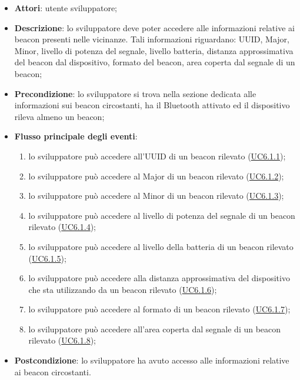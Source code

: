 \documentclass[../AnalisiDeiRequisiti.tex]{subfiles}
\begin{document}
\begin{itemize}
	\item \textbf{Attori}: utente sviluppatore;
	\item \textbf{Descrizione}: lo sviluppatore deve poter accedere alle informazioni relative ai beacon presenti nelle vicinanze. Tali informazioni riguardano: UUID, Major, Minor, livello di potenza del segnale, livello batteria, distanza approssimativa del beacon dal dispositivo, formato del beacon, area coperta dal segnale di un beacon; 
	\item \textbf{Precondizione}: lo sviluppatore si trova nella sezione dedicata alle informazioni sui beacon circostanti, ha il Bluetooth attivato ed il dispositivo rileva almeno un beacon;
	
	\item \textbf{Flusso principale degli eventi}:
	\begin{enumerate}
		\item lo sviluppatore può accedere all'UUID di un beacon rilevato (\hyperlink{UC6.1.1}{UC6.1.1});
		\item lo sviluppatore può accedere al Major di un beacon rilevato (\hyperlink{UC6.1.2}{UC6.1.2});
		\item lo sviluppatore può accedere al Minor di un beacon rilevato (\hyperlink{UC6.1.3}{UC6.1.3});
		\item lo sviluppatore può accedere al livello di potenza del segnale di un beacon rilevato (\hyperlink{UC6.1.4}{UC6.1.4});
		\item lo sviluppatore può accedere al livello della batteria di un beacon rilevato (\hyperlink{UC6.1.5}{UC6.1.5});
		\item lo sviluppatore può accedere alla distanza approssimativa del dispositivo che sta utilizzando da un beacon rilevato (\hyperlink{UC6.1.6}{UC6.1.6});
		\item lo sviluppatore può accedere al formato di un beacon rilevato (\hyperlink{UC6.1.7}{UC6.1.7});
		\item lo sviluppatore può accedere all'area coperta dal segnale di un beacon rilevato (\hyperlink{UC6.1.8}{UC6.1.8});
		
	\end{enumerate}
	\item \textbf{Postcondizione}: lo sviluppatore ha avuto accesso alle informazioni relative ai beacon circostanti.
\end{itemize}
\hypertarget{UC6.1.1}{}
\end{document}
